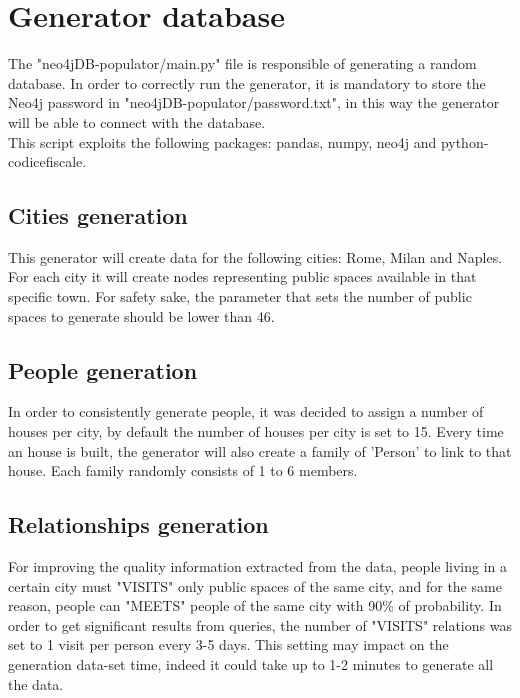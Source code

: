 \documentclass{article}
\begin{document}
\newpage
\section{Generator database}
The {\selectfont"neo4jDB-populator/main.py"} file is responsible of generating a random database.
In order to correctly run the generator, it is mandatory to store the Neo4j password in {\selectfont"neo4jDB-populator/password.txt"}, in this way the generator will be able to connect with the database.
\\This script exploits the following packages: {\selectfont pandas, numpy, neo4j and python-codicefiscale}.

\subsection{Cities generation}
This generator will create data for the following cities: Rome, Milan and Naples. For each city it will create nodes representing public spaces available in that specific town. For safety sake, the parameter that sets the number of public spaces to generate should be lower than 46.

\subsection{People generation}
In order to consistently generate people, it was decided to assign a number of houses per city, by default the number of houses per city is set to 15. Every time an house is built, the generator will also create a family of 'Person' to link to that house.
Each family randomly consists of 1 to 6 members.

\subsection{Relationships generation}
For improving the quality information extracted from the data, people living in a certain city must "VISITS" only public spaces of the same city, and for the same reason, people can "MEETS" people of the same city with 90\% of probability.
In order to get significant results from queries, the number of "VISITS" relations was set to 1 visit per person every 3-5 days. This setting may impact on the generation data-set time, indeed it could take up to 1-2 minutes to generate all the data.
\end{document}

